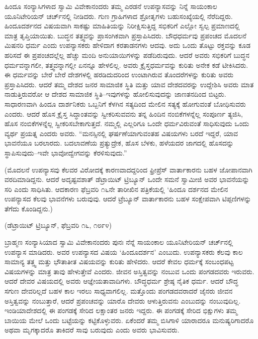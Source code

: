 ಹಿಂದೂ ಸಂನ್ಯಾಸಿಗಳಾದ ಸ್ವಾಮಿ ವಿವೇಕಾನಂದರು ತಮ್ಮ ಎರಡನೆ ಉಪನ್ಯಾಸವನ್ನು ನಿನ್ನೆ ಸಾಯಂಕಾಲ ಯೂನಿಟೇರಿಯನ್​ ಚರ್ಚ್​ನಲ್ಲಿ ನೀಡಿದರು. ಗುಣ ಗ್ರಾಹಿಗಳಾದ ಶ್ರೋತೃಗಳು ಬಹುಸಂಖ್ಯೆಯಲ್ಲಿ ನೆರೆದಿದ್ದರು. ಹಿಂದೂದರ್ಶನದ ವಿಷಯವಾಗಿ ಸಾಕಷ್ಟು ಮಾಹಿತಿಯನ್ನು ನಿರೀಕ್ಷಿಸುತ್ತಿದ್ದ ಸಭಿಕರಿಗೆ ಎಲ್ಲೋ ಸ್ವಲ್ಪ ಪ್ರಮಾಣದಲ್ಲಿ ಮಾತ್ರ ತೃಪ್ತಿ\break ಯಾಯಿತು. ಬುದ್ಧನ ತತ್ತ್ವವನ್ನು ಪ್ರಾಸಂಗಿಕವಾಗಿ ಪ್ರಸ್ತಾಪಿಸಿದರು. ಬೌಧಧರ್ಮವು ಪ್ರಪಂಚದ ಮೊದಲನೆ ಮಿಷನರಿ ಧರ್ಮ ಎಂದು ಉಪನ್ಯಾಸಕರು ಹೇಳಿದಾಗ ಕರತಾಡನ\break ಗಳು ಆದವು. ಅದು ಒಂದು ತೊಟ್ಟು ರಕ್ತವನ್ನು ಕೂಡ ಹರಿಸದೆ ಈ ಪ್ರಪಂಚದಲ್ಲೆಲ್ಲ ಹೆಚ್ಚು ಮಂದಿ ಅನುಯಾಯಿಗಳನ್ನು ಪಡೆದಿರುವುದು. ಆದರೆ ಅವರು ಸಭಿಕರಿಗೆ ಬುದ್ಧನ ಧರ್ಮವನ್ನಾಗಲೀ, ತತ್ತ್ವವನ್ನಾಗಲ್ಲೀ ಏನನ್ನೂ ಹೇಳಲಿಲ್ಲ. ಅವರು ಕ್ರೈಸ್ತಧರ್ಮವನ್ನು ಕುರಿತು ಅನೇಕ ಕಡೆ ಟೀಕಿಸಿದರು. ಈ ಧರ್ಮವನ್ನು ಬೇರೆ ಬೇರೆ ದೇಶಗಳಲ್ಲಿ ಹರಡಿದುದ\break ರಿಂದ ಉಂಟಾಗಿರುವ ತೊಂದರೆಗಳನ್ನು ಕುರಿತು ಅವರು ಪ್ರಸ್ತಾಪಿಸಿದರು. ಆದರೆ ತಮ್ಮ ದೇಶದ ಜನರ ಸಾಮಾಜಿಕ ಸ್ಥಿತಿ ಮತ್ತು ಯಾವ ದೇಶದವರನ್ನು ಉದ್ದೇಶಿಸಿ ಅವರು ಮಾತ ನಾಡುತ್ತಿರುವರೋ ಆ ದೇಶದ ಸಾಮಾಜಿಕ ಸ್ಥಿತಿ–ಇವುಗಳನ್ನು ಹೋಲಿಸುವುದನ್ನು ಜಾಣತನದಿಂದ ಬಿಟ್ಟರು. ಸಾಧಾರಣವಾಗಿ ಹಿಂದೂ ದಾರ್ಶನಿಕರು ಒಬ್ಬನಿಗೆ ಕೆಳಗಿನ ಸತ್ಯದಿಂದ ಮೇಲಿನ ಸತ್ಯಕ್ಕೆ ಹೋಗುವಂತೆ ಬೋಧಿಸುವರು ಎಂದರು. ಆದರೆ ಹೊಸ ಕ್ರೈಸ್ತ ಸಿದ್ಧಾಂತವನ್ನು ಸ್ವೀಕರಿಸುವವನು ತನ್ನ ಹಿಂದಿನ ನಂಬಿಕೆಗಳನ್ನೆಲ್ಲ ಸಂಪೂರ್ಣ ತ್ಯಜಿಸಿ, ಹೊಸ ನಂಬಿಕೆಗಳನ್ನೆಲ್ಲ ಸ್ವೀಕರಿಸಬೇಕಾಗುತ್ತದೆ. ನಮ್ಮಲ್ಲಿ ಎಲ್ಲರಿಗೂ ಒಂದೇ ಧರ್ಮವಿರುವಂತೆ ಸಾಧಿಸುವುದು ಒಂದು ವ್ಯರ್ಥ ಪ್ರಯತ್ನ ಎಂದರು ಅವರು. “ಮನಸ್ಸಿನಲ್ಲಿ ಘರ್ಷಣೆಯಾಗು\break ವಂತಹ ವಿಷಯಗಳು ಬರದೆ ಇದ್ದರೆ, ಯಾವ ಭಾವನೆಯೂ ಬರಲಾರದು. ಬದಲಾವಣೆಯ ಪ್ರತ್ಯುದ್ರೇಕ, ಹೊಸ ಬೆಳಕು, ಹಳೆಯದರ ಜಾಗದಲ್ಲಿ ಹೊಸದನ್ನು ಸ್ಥಾಪಿಸುವುದು–ಇವೇ ಭಾವೋದ್ವೇಗವನ್ನು ಕೆರಳಿಸುವುದು.”

\begin{center}
(ಮೊದಲನೆ ಉಪನ್ಯಾಸವು ಕೆಲವರ ವಿರೋದಕ್ಕೆ ಕಾರಣವಾದದ್ದರಿಂದ ಫ್ರೀಪ್ರೆಸ್​ ವಾರ್ತಾಕಾರನು ಬಹಳ ಜೋಪಾನವಾಗಿ ವರದಿಮಾಡಿದ್ದನು. ಆದರೆ ಅದೃಷ್ಟವಶಾತ್​ ಡೆಟ್ರಾಯಿಟ್​ ಟ್ರಿಬ್ಯೂನ್​ ಒಂದೇ ಸಮನೆ ಸ್ವಾಮೀಜಿ ಅವರ ಭಾವನೆಯನ್ನು ಸರಿ ಎಂದು ಸಾಧಿಸಿತು. ಆದಕಾರಣ ಫೆಬ್ರವರಿ ೧೬ನೇ ತಾರೀಖಿನ ಪತ್ರಿಕೆಯಲ್ಲಿ ‘ಹಿಂದೂ ದರ್ಶನದ ಮೇಲಿನ ಉಪನ್ಯಾಸದ ಕೆಲವು ಭಾವನೆಗಳು ಬರುವುವು. ಆದರೆ ಟ್ರೆಬ್ಯೂನ್​ ವಾರ್ತಾಕಾರನು ಬಹಳ ಸಂಕ್ಷೇಪವಾಗಿ ಟಿಪ್ಪಣಿಗಳನ್ನು ತೆಗೆದು ಕೊಂಡಿದ್ದನು.)
\end{center}

\begin{center}
(ಡೆಟ್ರಾಯಿಟ್​ ಟ್ರಿಬ್ಯೂನ್​, ಫೆಬ್ರವರಿ ೧೬, ೧೮೯೪)
\end{center}

\vskip -0.5cm

ಬ್ರಾಹ್ಮಣ ಸಂನ್ಯಾಸಿಯಾದ ಸ್ವಾಮಿ ವಿವೇಕಾನಂದರು ಪುನಃ ನೆನ್ನೆ ಸಾಯಂಕಾಲ ಯೂನಿಟೇರಿಯನ್​ ಚರ್ಚ್​ನಲ್ಲಿ ಉಪನ್ಯಾಸ ಮಾಡಿದರು. ಅವರ ಉಪನ್ಯಾಸದ ವಿಷಯ ‘ಹಿಂದೂದರ್ಶನ’ ಎಂಬುದು. ಉಪನ್ಯಾಸಕರು ಕೆಲವು ಕಾಲ ಸಾಮಾನ್ಯ ತತ್ತ್ವ ಮತ್ತು ಭೌತಾತೀತ ವಿಷಯವನ್ನು ಕುರಿತು ಹೇಳಿದರು. ಆದರೆ ಕೇವಲ ಧರ್ಮಕ್ಕೆ ಸಂಬಂಧಪಟ್ಟ ವಿಷಯಗಳನ್ನು ಮಾತ್ರ ತಾವು ಹೇಳುತ್ತೇವೆ ಎಂದರು. ಜೀವನ ಅಸ್ತಿತ್ವವನ್ನು ನಂಬುವ ಒಂದು ಪಂಗಡದವರು ಇರುವರು. ಆದರೆ ದೇವರ ವಿಷಯದಲ್ಲಿ ಅವರು ಆಜ್ಞೇಯತಾವಾದಿಗಳು. ಬೌದ್ಧಧರ್ಮ ಶ್ರೇಷ್ಠ ನೈತಿಕ ಧರ್ಮ. ಆದರೆ ಬೌದ್ಧ ಸಗುಣ ದೇವರಿಲ್ಲದೆ ಬಹಳ ಕಾಲ ಇರಲು ಸಾಧ್ಯವಾಗಲಿಲ್ಲ. ಮತ್ತೊಂದು ಪಂಗಡದವರಾದರೆ ಜೈನರು ಜೀವನ ಅಸ್ತಿತ್ವವನ್ನು ನಂಬುತ್ತಾರೆ, ಆದರೆ ಪ್ರಪಂಚವನ್ನು ಯಾರೊ ದೇವರು ಆಳುತ್ತಿರುವನು ಎಂಬುದನ್ನು ನಂಬುವುದಿಲ್ಲ. ಇಂಡಿಯಾದೇಶದಲ್ಲಿ ಈ ಪಂಗಡಕ್ಕೆ ಸೇರಿದ ಲಕ್ಷಾಂತರ ಜನರು ಇದ್ದರು. ಈ ಪಂಗಡಕ್ಕೆ ಸೇರಿದ ಭಿಕ್ಷುಗಳು ತಮ್ಮ ಬಾಯಿಯ ಮೇಲೆ ಒಂದು ಬಟ್ಟೆಯನ್ನು ಕಟ್ಟಿಕೊಳ್ಳುವರು. ಏಕೆಂದರೆ ತಮ್ಮ ಬಿಸಿಗಾಳಿ ಯಾರಾದರೂ ಮನುಷ್ಯರಿಗಾದರೊ ಅಥವಾ ಮೃಗಕ್ಕಾದರೊ ತಾಕಿದರೆ ಸಾವು ಬರುವುದು ಎಂದು ಅವರು ಭಾವಿಸುವರು.

